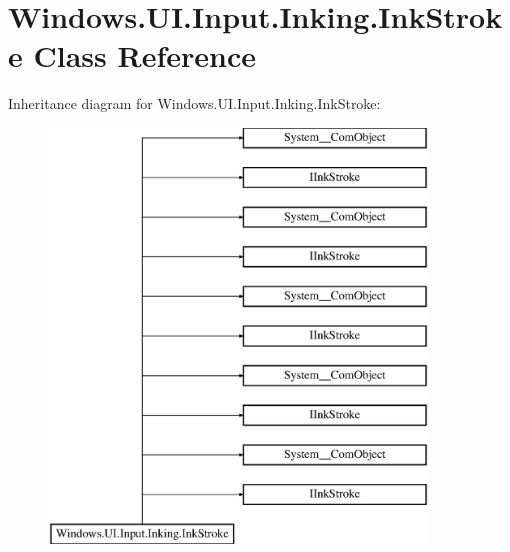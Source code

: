 \hypertarget{class_windows_1_1_u_i_1_1_input_1_1_inking_1_1_ink_stroke}{}\section{Windows.\+U\+I.\+Input.\+Inking.\+Ink\+Stroke Class Reference}
\label{class_windows_1_1_u_i_1_1_input_1_1_inking_1_1_ink_stroke}
Inheritance diagram for Windows.\+U\+I.\+Input.\+Inking.\+Ink\+Stroke\+:\begin{figure}[H]
\begin{center}
\leavevmode
\includegraphics[height=11.000000cm]{class_windows_1_1_u_i_1_1_input_1_1_inking_1_1_ink_stroke}
\end{center}
\end{figure}
